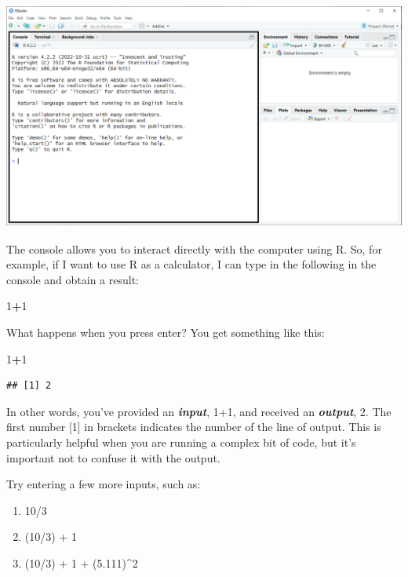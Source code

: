 \documentclass[
]{book}
\newenvironment{Shaded}{\begin{snugshade}}{\end{snugshade}}
\newcommand{\DecValTok}[1]{\textcolor[rgb]{0.00,0.00,0.81}{#1}}
\newcommand{\SpecialCharTok}[1]{\textcolor[rgb]{0.81,0.36,0.00}{\textbf{#1}}}
\begin{document}
\includegraphics{docs/_main_files/figure-html/RStudio console box.png}

The console allows you to interact directly with the computer using R. So, for example, if I want to use R as a calculator, I can type in the following in the console and obtain a result:

\begin{Shaded}
\begin{Highlighting}[]
\DecValTok{1}\SpecialCharTok{+}\DecValTok{1}
\end{Highlighting}
\end{Shaded}

What happens when you press enter? You get something like this:

\begin{Shaded}
\begin{Highlighting}[]
\DecValTok{1}\SpecialCharTok{+}\DecValTok{1}
\end{Highlighting}
\end{Shaded}

\begin{verbatim}
## [1] 2
\end{verbatim}

In other words, you've provided an \textbf{\emph{input}}, 1+1, and received an \textbf{\emph{output}}, 2. The first number {[}1{]} in brackets indicates the number of the line of output. This is particularly helpful when you are running a complex bit of code, but it's important not to confuse it with the output.

Try entering a few more inputs, such as:

\begin{enumerate}
\def\labelenumi{\arabic{enumi}.}
\item
  10/3
\item
  (10/3) + 1
\item
  (10/3) + 1 + (5.111)\^{}2
\end{enumerate}
\end{document}
